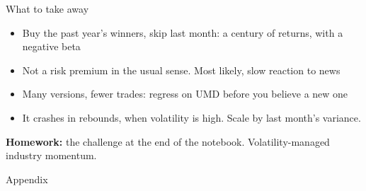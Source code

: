 \documentclass[aspectratio=169,10pt]{beamer}
\begin{document}
\begin{frame}{What to take away}
\begin{itemize}
\item Buy the past year's winners, skip last month: a century of returns, with a negative beta
\vskip 10pt
\item Not a risk premium in the usual sense. Most likely, slow reaction to news
\vskip 10pt
\item Many versions, fewer trades: regress on UMD before you believe a new one
\vskip 10pt
\item It crashes in rebounds, when volatility is high. Scale by last month's variance.
\end{itemize}
\vskip 14pt
{\small \textbf{Homework:} the challenge at the end of the notebook. Volatility-managed industry momentum.}
\end{frame}

\appendix
\begin{frame}
\begin{center}
{\Large Appendix}
\end{center}
\end{frame}
\end{document}
